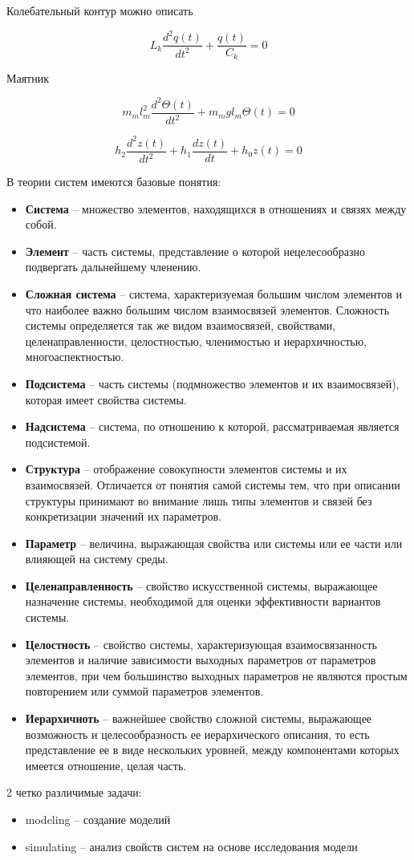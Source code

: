 Колебательный контур можно описать

\begin{equation*}
    L_k \frac{d^2 q(t)}{dt^2} + \frac{q(t)}{C_k} = 0
\end{equation*}

Маятник

\begin{equation*}
    m_m l_m^2 \frac{d^2 \Theta (t)}{dt^2} + m_m gl_m \Theta(t) = 0
\end{equation*}

\begin{equation*}
    h_2 \frac{d^2z(t)}{dt^2} + h_1 \frac{dz(t)}{dt} + h_0 z(t) = 0
\end{equation*}

В теории систем имеются базовые понятия:

\begin{itemize}
    \item \textbf{Система} -- множество элементов, находящихся в отношениях и связях между собой.
    \item \textbf{Элемент} -- часть системы, представление о которой нецелесообразно подвергать дальнейшему членению.
    \item \textbf{Сложная система} -- система, характеризуемая большим числом элементов и что наиболее важно большим числом взаимосвязей элементов. Сложность системы определяется так же видом взаимосвязей, свойствами, целенаправленности, целостностью, членимостью и иерархичностью, многоаспектностью.
    \item \textbf{Подсистема} -- часть системы (подмножество элементов и их взаимосвязей), которая имеет свойства системы.
    \item \textbf{Надсистема} -- система, по отношению к которой, рассматриваемая является подсистемой.
    \item \textbf{Структура} -- отображение совокупности элементов системы и их взаимосвязей. Отличается от понятия самой системы тем, что при описании структуры принимают во внимание лишь типы элементов и связей без конкретизации значений их параметров.
    \item \textbf{Параметр} -- величина, выражающая свойства или системы или ее части или влияющей на систему среды.
    \item \textbf{Целенаправленность} -- свойство искусственной системы, выражающее назначение системы, необходимой для оценки эффективности вариантов системы.
    \item \textbf{Целостность} -- свойство системы, характеризующая взаимосвязанность элементов и наличие зависимости выходных параметров от параметров элементов, при чем большинство выходных параметров не являются простым повторением или суммой параметров элементов.
    \item \textbf{Иерархичноть} -- важнейшее свойство сложной системы, выражающее возможность и целесообразность ее иерархического описания, то есть представление ее в виде нескольких уровней, между компонентами которых имеется отношение, целая часть.
\end{itemize}

2 четко различимые задачи:

\begin{itemize}
    \item modeling -- создание моделий
    \item simulating -- анализ свойств систем на основе исследования модели
\end{itemize}
